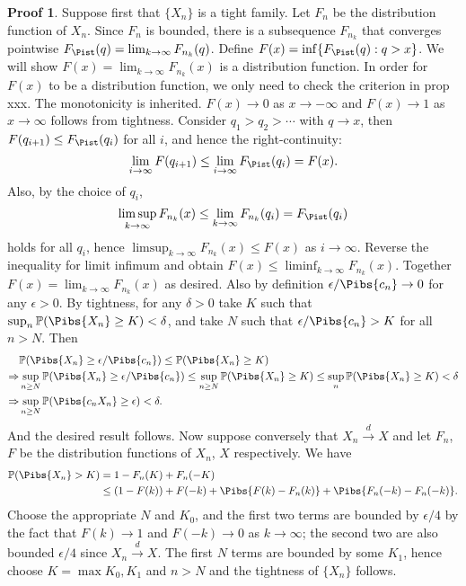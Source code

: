 \documentclass[hidelinks,11pt]{article}
\theoremstyle{definition}
\theoremstyle{dotless}
\newtheorem{prop}{Proof}[section]
\theoremstyle{remark}
\DeclareMathOperator{\1}{\mathbf{1}}
\begin{document}
\begin{prop}
Suppose first that $\{X_n\}$ is a tight family. Let $F_n$ be the distribution function of $X_n$. Since $F_n$ is bounded, there is a subsequence $F_{n_k}$ that converges pointwise $F_\Pist(q)=\lim_{k\to\infty}F_{n_k}(q)$. Define $F(x)=\inf\{F_\Pist(q):q>x\}$. We will show $F(x)=\lim_{k\to\infty}F_{n_k}(x)$ is a distribution function.\medbreak
In order for $F(x)$ to be a distribution function, we only need to check the criterion in prop xxx. The monotonicity is inherited. $F(x)\to0$ as $x\to-\infty$ and $F(x)\to1$ as $x\to\infty$ follows from tightness. Consider $q_1>q_2>\cdots$ with $q\to x$, then $F(q_{i+1})\leq F_\Pist(q_i)$ for all $i$, and hence the right-continuity:
\[\lim_{i\to\infty}F(q_{i+1})\leq\lim_{i\to\infty}F_\Pist(q_i)=F(x).\]
Also, by the choice of $q_i$,
\[\limsup_{k\to\infty}F_{n_k}(x)\leq\lim_{k\to\infty}F_{n_k}(q_i)=F_\Pist(q_i)\]
holds for all $q_i$, hence $\limsup_{k\to\infty}F_{n_k}(x)\leq F(x)$ as $i\to\infty$. Reverse the inequality for limit infimum and obtain $F(x)\leq\liminf_{k\to\infty}F_{n_k}(x)$. Together $F(x)=\lim_{k\to\infty}F_{n_k}(x)$ as desired.\medbreak
Also by definition $\epsilon/\Pibs{c_n}\to0$ for any $\epsilon>0$. By tightness, for any $\delta>0$ take $K$ such that $\sup_n\mathbb{P}(\Pibs{X_n}\geq K)<\delta$, and take $N$ such that $\epsilon/\Pibs{c_n}>K$ for all $n>N$. Then
\begin{align*}
    &\mathbb{P}(\Pibs{X_n}\geq\epsilon/\Pibs{c_n})\leq\mathbb{P}(\Pibs{X_n}\geq K)\\
    \Rightarrow&\sup_{n\geq N}\mathbb{P}(\Pibs{X_n}\geq\epsilon/\Pibs{c_n})\leq\sup_{n\geq N}\mathbb{P}(\Pibs{X_n}\geq K)\leq\sup_n\mathbb{P}(\Pibs{X_n}\geq K)<\delta\\
    \Rightarrow&\sup_{n\geq N}\mathbb{P}(\Pibs{c_nX_n}\geq\epsilon)<\delta.
\end{align*}
And the desired result follows.\medbreak
Now suppose conversely that $X_n\xrightarrow{d}X$ and let $F_n$, $F$ be the distribution functions of $X_n$, $X$ respectively. We have
\begin{align*}
\mathbb{P}(\Pibs{X_n}>K)&=1-F_n(K)+F_n(-K)\\
&\leq(1-F(k))+F(-k)+\Pibs{F(k)-F_n(k)}+\Pibs{F_n(-k)-F_n(-k)}.
\end{align*}
Choose the appropriate $N$ and $K_0$, and the first two terms are bounded by $\epsilon/4$ by the fact that $F(k)\to1$ and $F(-k)\to0$ as $k\to\infty$; the second two are also bounded $\epsilon/4$ since $X_n\xrightarrow{d}X$. The first $N$ terms are bounded by some $K_1$, hence choose $K=\max{K_0,K_1}$ and $n>N$ and the tightness of $\{X_n\}$ follows.
\end{prop}
\end{document}
